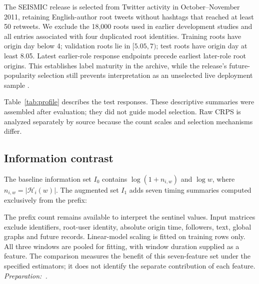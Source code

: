The SEISMIC release is selected from Twitter activity in October--November 2011, retaining English-author root tweets without hashtags that reached at least 50 retweets. We exclude the 18,000 roots used in earlier development studies and all entries associated with four duplicated root identities. Training roots have origin day below 4; validation roots lie in \([5.05,7)\); test roots have origin day at least 8.05. Latest earlier-role response endpoints precede earliest later-role root origins. This establishes label maturity in the archive, while the release's future-popularity selection still prevents interpretation as an unselected live deployment sample \cite{seismic2015}.

Table~\ref{tab:profile} describes the test responses. These descriptive summaries were assembled after evaluation; they did not guide model selection. Raw CRPS is analyzed separately by source because the count scales and selection mechanisms differ.



\hypertarget{information-contrast}{%
\subsection{Information contrast}}

The baseline information set \(I_0\) contains \(\log(1+n_{i,w})\) and \(\log w\), where \(n_{i,w}=|\mathcal H_i(w)|\). The augmented set \(I_1\) adds seven timing summaries computed exclusively from the prefix:



The prefix count remains available to interpret the sentinel values. Input matrices exclude identifiers, root-user identity, absolute origin time, followers, text, global graphs and future records. Linear-model scaling is fitted on training rows only. All three windows are pooled for fitting, with window duration supplied as a feature. The comparison measures the benefit of this seven-feature set under the specified estimators; it does not identify the separate contribution of each feature. {\small\textit{Preparation:~\cite{openai2026}.}}
